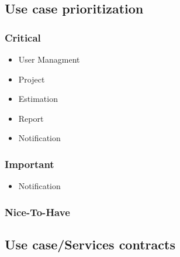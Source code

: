 \subsection{Use case prioritization}
\subsubsection{Critical}
	\begin{itemize}
	\item{User Managment}
	\item{Project}
	\item{Estimation}
	\item{Report}
	\item{Notification}
	\end{itemize}
\subsubsection{Important}
	\begin{itemize}
	\item{Notification}
	\end{itemize}
\subsubsection{Nice-To-Have}
\subsection{Use case/Services contracts}

